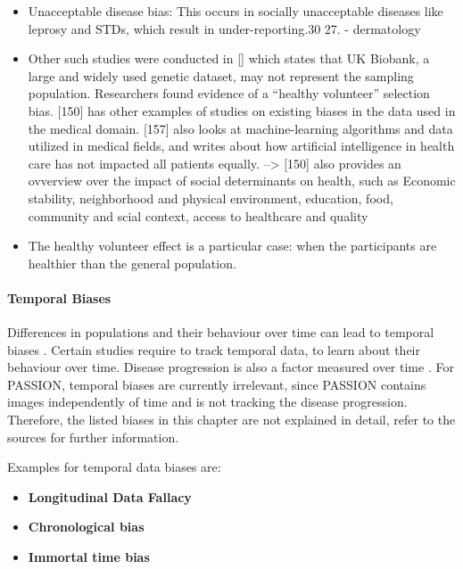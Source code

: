 \begin{refsection}
\begin{itemize}
			\item Unacceptable disease bias: This occurs in socially unacceptable diseases like leprosy and STDs, which result in under-reporting.30 27. \autocite{Chakraborty_2024} - dermatology
			
			\item \todo Other such studies were conducted in [\autocite{M54_Fry_2017}] which states that UK Biobank, a large and widely used genetic dataset, may not represent the sampling population. Researchers found evidence of a “healthy volunteer” selection bias. [150] has other examples of studies on existing biases in the data used in the medical domain. [157] also looks at machine-learning algorithms and data utilized in medical fields, and writes about how artificial intelligence in health care has not impacted all patients equally.\autocite{Mehrabi_2021} --> [150] also provides an ovverview over the impact of social determinants on health, such as Economic stability, neighborhood and physical environment, education, food, community and scial context, access to healthcare and quality
			\item The healthy volunteer effect is a particular case: when the participants are healthier than the general population. \autocite{Delgado-Rodriguez_2004}
			\rawcitationusedend
		\end{itemize}
		\rawcitationend
		
		\paragraph{Temporal Biases}
		Differences in populations and their behaviour over time can lead to temporal biases \autocite{M120_Olteanu_2019}.
		Certain studies require to track temporal data, to learn about their behaviour over time. Disease progression is also a factor measured over time \autocite{Mehrabi_2021}. For PASSION, temporal biases are currently irrelevant, since PASSION contains images independently of time and is not tracking the disease progression. Therefore, the listed biases in this chapter are not explained in detail, refer to the sources for further information.
		
		Examples for temporal data biases are:
		\begin{itemize}
			\item \textbf{Longitudinal Data Fallacy} \autocite{Mehrabi_2021}
			\item \textbf{Chronological bias} \autocite{Chakraborty_2024, c9, c13}
			\item \textbf{Immortal time bias} \autocite{Chakraborty_2024, c24, c20}
		\end{itemize}
		

\end{refsection}
